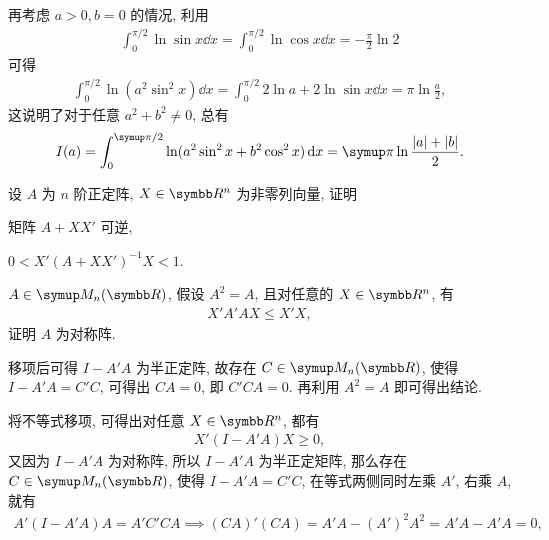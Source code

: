 \begin{exercise}[resume=exer]
\begin{answer}
            再考虑 $ a > 0, b = 0 $ 的情况, 利用
            \begin{align*}
                \int_{0}^{\pi/2} \ln\sin x\dd{x} = \int_{0}^{\pi/2} \ln\cos x\dd{x} = -\frac{\pi}{2} \ln 2
            \end{align*}
            可得
            \begin{align*}
                \int_{0}^{\pi/2} \ln(a^{2}\sin^{2}x) \dd{x} = \int_{0}^{\pi/2} 2\ln a + 2\ln \sin x\dd{x} = \pi\ln\frac{a}{2}, 
            \end{align*}
            这说明了对于任意 $ a^{2} + b^{2} \ne 0 $, 总有
            \begin{align*}
                I(a) = \int_{0}^{\pi/2} \ln (a^{2}\sin^{2}x + b^{2}\cos^{2}x) \dd{x} = \pi\ln\frac{\abs{a} + \abs{b}}{2}.
            \end{align*} 
        \end{answer}
        \item 设 $ A $ 为 $ n $ 阶正定阵, $ X \in \R^{n} $ 为非零列向量, 证明
        \begin{exercise}
            \item 矩阵 $ A + XX' $ 可逆,
            \item $ 0 < X'(A + XX')^{-1}X < 1 $. 
        \end{exercise}
        \item $ A\in \MM $, 假设 $ A^{2} = A $, 且对任意的 $ X \in \R^{n} $, 有
        \begin{align*}
            X'A'AX \le X'X,
        \end{align*}
        证明 $ A $ 为对称阵.
        \begin{hint}
            移项后可得 $ I - A'A $ 为半正定阵, 故存在 $ C \in \MM $, 使得 $ I - A'A = C'C $, 可得出 $ CA = 0 $, 即 $ C'CA = 0 $. 再利用 $ A^{2} = A $ 即可得出结论.
        \end{hint}
        \begin{answer}
            将不等式移项, 可得出对任意 $ X \in \R^{n} $, 都有
            \begin{align*}
                X'(I - A'A)X \ge 0,
            \end{align*}
            又因为 $ I - A'A $ 为对称阵, 所以 $ I - A'A $ 为半正定矩阵, 那么存在 $ C \in \MM $, 使得 $ I - A'A = C'C $, 在等式两侧同时左乘 $ A' $, 右乘 $ A $, 就有
            \begin{align*}
                A'(I - A'A)A = A'C'CA \implies (CA)'(CA) = A'A - (A')^{2}A^{2} = A'A - A'A = 0,
            \end{align*}

\end{answer}
\end{exercise}

